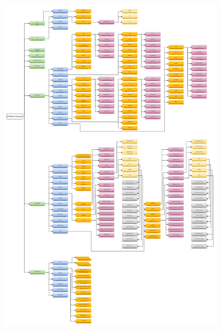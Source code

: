 \begin{figure}
    \centering
    \includegraphics[width=1\linewidth]{LATEX/Appendices/Images/Software/files-listing.png}
    \label{fig:files-listing}
\end{figure}
